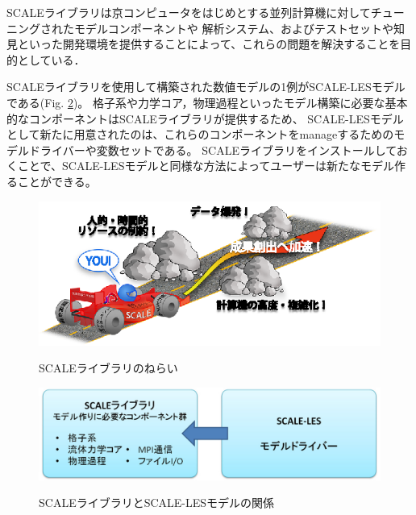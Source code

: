 SCALEライブラリは京コンピュータをはじめとする並列計算機に対してチューニングされたモデルコンポーネントや
解析システム、およびテストセットや知見といった開発環境を提供することによって、これらの問題を解決することを目的としている．

SCALEライブラリを使用して構築された数値モデルの1例がSCALE-LESモデルである(Fig. \ref{fig:scale-les})。
格子系や力学コア，物理過程といったモデル構築に必要な基本的なコンポーネントはSCALEライブラリが提供するため、
SCALE-LESモデルとして新たに用意されたのは、これらのコンポーネントをmanageするためのモデルドライバーや変数セットである。
SCALEライブラリをインストールしておくことで、SCALE-LESモデルと同様な方法によってユーザーは新たなモデル作ることができる。

\begin{figure}[t]
\begin{center}
  \includegraphics[width=0.6\hsize]{./figure/library.eps}\\
  \caption{SCALEライブラリのねらい}
  \label{fig:scale}
\end{center}
\end{figure}

\begin{figure}[t]
\begin{center}
  \includegraphics[width=0.9\hsize]{./figure/scale_and_scale-les.eps}\\
  \caption{SCALEライブラリとSCALE-LESモデルの関係}
  \label{fig:scale-les}
\end{center}
\end{figure}
